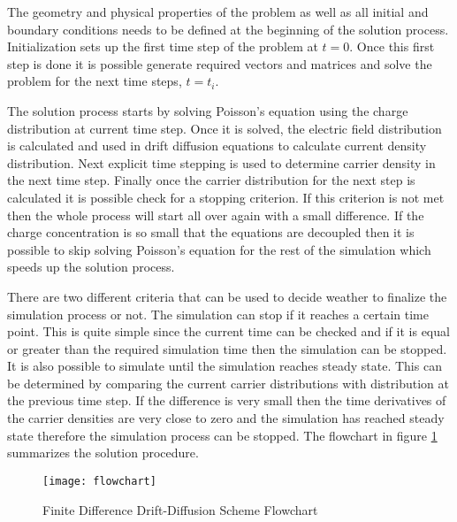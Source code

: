\begin{doublespace}
The geometry and physical properties of the problem as well as all initial and boundary conditions needs to be defined at the beginning of the solution process. Initialization sets up the first time step of the problem at $t=0$. Once this first step is done it is possible generate required vectors and matrices and solve the problem for the next time steps, $t=t_i$. 

The solution process starts by solving Poisson's equation using the charge distribution at current time step. Once it is solved, the electric field distribution is calculated and used in drift diffusion equations to calculate current density distribution. Next explicit time stepping is used to determine carrier density in the next time step. Finally once the carrier distribution for the next step is calculated it is possible check for a stopping criterion. If this criterion is not met then the whole process will start all over again with a small difference. If the charge concentration is so small that the equations are decoupled then it is possible to skip solving Poisson's equation for the rest of the simulation which speeds up the solution process.

 There are two different criteria that can be used to decide weather to finalize the simulation process or not. The simulation can stop if it reaches a certain time point. This is quite simple since the current time can be checked and if it is equal or greater than the required simulation time then the simulation can be stopped. It is also possible to simulate until the simulation reaches steady state. This can be determined by comparing the current carrier distributions with distribution at the previous time step. If the difference is very small then the time derivatives of the carrier densities are very close to zero and the simulation has reached steady state therefore the simulation process can be stopped. The flowchart in figure \ref{flowchart} summarizes the solution procedure.


\clearpage

\begin{figure}
\centering
\texttt{[image: flowchart]}
\caption{Finite Difference Drift-Diffusion Scheme Flowchart} 
\label{flowchart}
\end{figure}

\end{doublespace}
